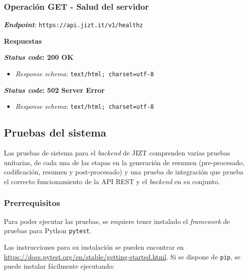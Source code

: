 \subsubsection{Operación GET - Salud del servidor}

\textbf{\emph{Endpoint}}: \texttt{https://api.jizt.it/v1/healthz}

\vspace{0.3cm}
\textbf{Respuestas}

\textbf{\emph{Status code}: 200 OK}

\vspace{-0.3cm}
\begin{itemize} [\textbullet]
	\item \emph{Response schema}: \texttt{text/html; charset=utf-8}
\end{itemize}

\textbf{\emph{Status code}: 502 Server Error}

\vspace{-0.3cm}
\begin{itemize} [\textbullet]
	\item \emph{Response schema}: \texttt{text/html; charset=utf-8}
\end{itemize}


\subsection{Pruebas del sistema}

Las pruebas de sistema para el \emph{backend} de JIZT comprenden varias pruebas unitarias, de cada una de las etapas en la generación de resumen (pre-procesado, codificación, resumen y post-procesado) y una prueba de integración que prueba el correcto funcionamiento de la API REST y el \emph{backend} en su conjunto.

\subsubsection{Prerrequisitos}

Para poder ejecutar las pruebas, se requiere tener instalado el \emph{framework} de pruebas para Python \texttt{pytest}.

Las instrucciones para su instalación se pueden encontrar en \href{https://docs.pytest.org/en/stable/getting-started.html}{https://docs.\newline pytest.org/en/stable/getting-started.html}. Si se dispone de \texttt{pip}, se puede instalar fácilmente ejecutando:

